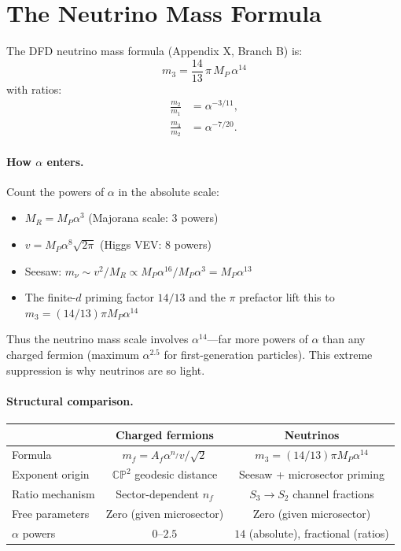 \documentclass[11pt,a4paper]{article}
\begin{document}
\section{The Neutrino Mass Formula}

The DFD neutrino mass formula (Appendix X, Branch B) is:
\begin{equation}
\boxed{m_3 = \frac{14}{13}\,\pi\,M_P\,\alpha^{14}}
\end{equation}
with ratios:
\begin{align}
\frac{m_2}{m_1} &= \alpha^{-3/11}, \\
\frac{m_3}{m_2} &= \alpha^{-7/20}.
\end{align}

\paragraph{How $\alpha$ enters.}
Count the powers of $\alpha$ in the absolute scale:
\begin{itemize}
\item $M_R = M_P \alpha^3$ (Majorana scale: 3 powers)
\item $v = M_P \alpha^8 \sqrt{2\pi}$ (Higgs VEV: 8 powers)
\item Seesaw: $m_\nu \sim v^2/M_R \propto M_P \alpha^{16}/M_P \alpha^3
  = M_P \alpha^{13}$
\item The finite-$d$ priming factor $14/13$ and the $\pi$ prefactor lift
  this to $m_3 = (14/13)\pi M_P \alpha^{14}$
\end{itemize}

Thus the neutrino mass scale involves $\alpha^{14}$---far more powers of
$\alpha$ than any charged fermion (maximum $\alpha^{2.5}$ for first-generation
particles). This extreme suppression is why neutrinos are so light.

\paragraph{Structural comparison.}
\begin{center}
\begin{tabular}{lcc}
\toprule
& \textbf{Charged fermions} & \textbf{Neutrinos} \\
\midrule
Formula & $m_f = A_f \alpha^{n_f} v/\sqrt{2}$ &
  $m_3 = (14/13)\pi M_P \alpha^{14}$ \\
Exponent origin & $\mathbb{CP}^2$ geodesic distance &
  Seesaw + microsector priming \\
Ratio mechanism & Sector-dependent $n_f$ &
  $S_3 \to S_2$ channel fractions \\
Free parameters & Zero (given microsector) & Zero (given microsector) \\
$\alpha$ powers & $0$--$2.5$ & $14$ (absolute), fractional (ratios) \\
\bottomrule
\end{tabular}
\end{center}
\end{document}

